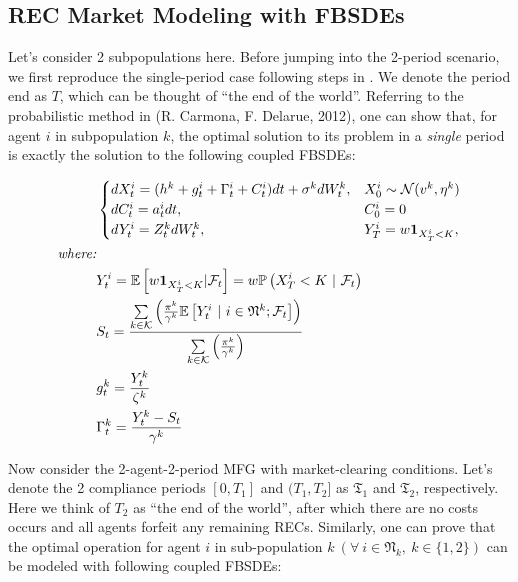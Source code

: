 \documentclass[a4paper,10pt]{article}
\newcommand{\1}{\mathbf{1}}
\begin{document}
\subsection{REC Market Modeling with
FBSDEs}\label{rec-market-modeling}



Let's consider 2 subpopulations here. Before jumping into the 2-period
scenario, we first reproduce the single-period case following steps in \cite{SC}. We
denote the period end as \(T\), which can be thought of ``the end of the
world''. Referring to the probabilistic method in \cite{RC} (R. Carmona, F. Delarue,
2012), one can show that, for agent \(i\) in subpopulation \(k\), the
optimal solution to its problem in a \emph{single} period is exactly the
solution to the following coupled FBSDEs:

\begin{alignat}{2}
    &\begin{cases}
        dX_t^{i} = (h^{k} + g_t^{i} + \Gamma_t^{i} + C_t^{i})dt + \sigma^{k}dW_t^{k},  &X_0^{i} \sim \mathcal{N}(v^k,\eta^k) \notag \\
        dC_t^{i} = a_t^{i}dt, &C_0^{i}=0 \notag \\
        dY_t^{i} = Z_t^{k}dW_t^{k}, &Y_{T}^{i} = w\mathbf{1}_{X_{T}^i<K}, \notag \\
    \end{cases}\\
    \textit{where:}&\\
        &Y_t^i = \mathbb{E} \left[w\mathbf{1}_{X_{T}^i< K}|\mathcal{F}_t \right] = w\mathbb{P}\left(X_{T}^i< K ~|~ \mathcal {F}_t\right) \notag \\
        &S_t = \frac{\sum\limits_{k \in \mathcal{K}} {\left(\frac{\pi^k}{\gamma^k}\mathbb{E}\left[ Y_t^i ~|~ i \in \mathfrak{N}^k; \mathcal{F}_t \right]\right)} }{\sum\limits_{k \in \mathcal{K}}{\left(\frac{\pi^k}{\gamma^k}\right)}} \notag \\
        &g_t^k = \frac{Y_t^k}{\zeta^k} \notag \\
        &\Gamma_t^{k} = \frac{Y_t^{k}-S_t}{\gamma^{k}} 
\end{alignat}


Now consider the 2-agent-2-period MFG with market-clearing conditions.
Let's denote the 2 compliance periods \([0,T_1]\) and \((T_1,T_2]\) as
\(\mathfrak{T_1}\) and \(\mathfrak{T_2}\), respectively. Here we think
of \(T_2\) as ``the end of the world'', after which there are no costs
occurs and all agents forfeit any remaining RECs. Similarly, one can
prove that the optimal operation for agent \(i\) in sub-population
\(k~(\forall~i \in \mathfrak{N}_k,~k\in\lbrace{1,2\rbrace})\) can be
modeled with following coupled FBSDEs:
\end{document}

